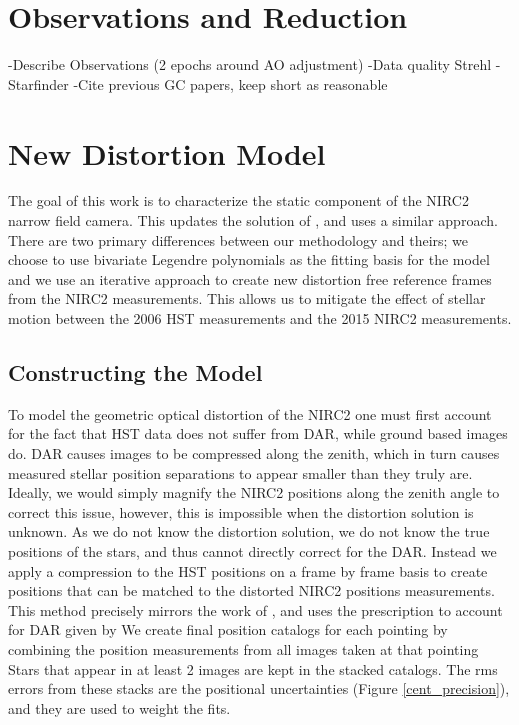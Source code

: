 \section{Observations and Reduction}
-Describe Observations (2 epochs around AO adjustment)
-Data quality Strehl
-Starfinder
-Cite previous GC papers, keep short as reasonable

\section{New Distortion Model}
The goal of this work is to characterize the static component of the NIRC2 narrow field camera.  This updates the solution of \cite{Yelda_2010}, and uses a similar approach.  There are two primary differences between our methodology and theirs; we choose to use bivariate Legendre polynomials as the fitting basis for the model and we use an iterative approach to create new distortion free reference frames from the NIRC2 measurements.  This allows us to mitigate the effect of stellar motion between the 2006 HST measurements and the 2015 NIRC2 measurements.
\subsection{Constructing the Model}
To model the geometric optical distortion of the NIRC2 one must first account for the fact that HST data does not suffer from DAR, while ground based images do.  DAR causes images to be compressed along the zenith, which in turn causes measured stellar position separations to appear smaller than they truly are.  Ideally, we would simply magnify the NIRC2 positions along the zenith angle to correct this issue, however,  this is impossible when the distortion solution is unknown.  As we do not know the distortion solution, we do not know the true positions of the stars, and thus cannot directly correct for the DAR.  Instead we apply a compression to the HST positions on a frame by frame basis to create positions that can be matched to the distorted NIRC2 positions measurements. This method precisely mirrors the work of \cite{Yelda_2010}, and uses the prescription to account for DAR given by \cite{Gubler}
We create final position catalogs for each pointing by combining the position measurements from all images taken at that pointing  Stars that appear in at least 2 images are kept in the stacked catalogs.  The rms errors from these stacks are the positional uncertainties (Figure \ref{cent_precision}), and they are used to weight the fits.


